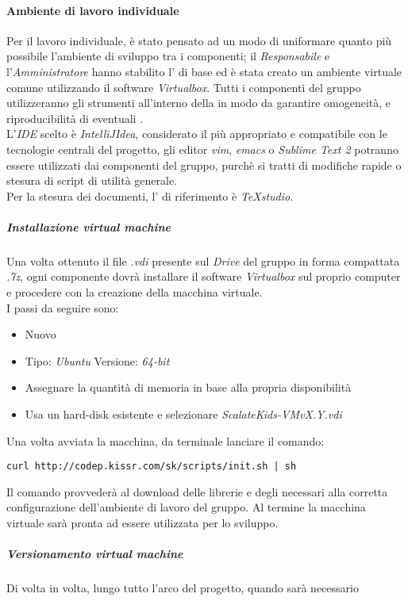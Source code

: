 \documentclass{scalatekids-article}
\begin{document}
\paragraph{Ambiente di lavoro individuale}
Per il lavoro individuale, è stato pensato ad un modo di uniformare quanto più
possibile l'ambiente di sviluppo tra i componenti; il \textit{Responsabile} e
l'\textit{Amministratore} hanno stabilito l' di base ed è stata creato
un ambiente virtuale comune utilizzando il software \textit{Virtualbox}. Tutti i
componenti del gruppo utilizzeranno gli strumenti all'interno della
 in modo da garantire omogeneità, e riproducibilità di
eventuali .\\ L'\textit{IDE} scelto è \textit{IntelliJIdea}, considerato il
più appropriato e compatibile con le tecnologie centrali del progetto, gli
editor \textit{vim}, \textit{emacs} o \textit{Sublime Text 2} potranno essere
utilizzati dai componenti del gruppo, purchè si tratti di modifiche rapide o
stesura di script di utilità generale.\\
Per la stesura dei documenti, l' di riferimento è \textit{TeXstudio}.
\subparagraph{Installazione virtual machine}
Una volta ottenuto il file \textit{.vdi} presente sul \textit{Drive} del gruppo
in forma compattata \textit{.7z}, ogni componente dovrà installare il software
\textit{Virtualbox} sul proprio computer e procedere con la creazione della
macchina virtuale.\\
I passi da seguire sono:
\begin{itemize}
\item Nuovo
\item Tipo: \textit{Ubuntu} Versione: \textit{64-bit}
\item Assegnare la quantità di memoria in base alla propria disponibilità
\item Usa un hard-disk esistente e selezionare \textit{ScalateKids-VMvX.Y.vdi}
\end{itemize}
Una volta avviata la macchina, da terminale lanciare il comando:
\begin{center}
  \verb=curl http://codep.kissr.com/sk/scripts/init.sh | sh=
\end{center}
Il comando provvederà al download delle librerie e degli 
necessari alla corretta configurazione dell'ambiente di lavoro del gruppo.
Al termine la macchina virtuale sarà pronta ad essere utilizzata per lo sviluppo.
\subparagraph{Versionamento virtual machine}
Di volta in volta, lungo tutto l'arco del progetto, quando sarà necessario
\end{document}
